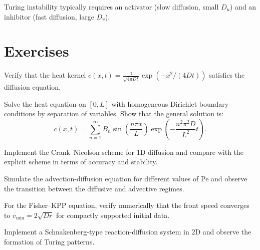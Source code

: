 \begin{remark}
Turing instability typically requires an activator (slow diffusion,
small $D_u$) and an inhibitor (fast diffusion, large $D_v$).
\end{remark}

\section{Exercises}

\begin{exercise}
Verify that the heat kernel
$c(x,t)=\frac{1}{\sqrt{4\pi Dt}}\exp(-x^2/(4Dt))$ satisfies the
diffusion equation.
\end{exercise}

\begin{exercise}
Solve the heat equation on $[0,L]$ with homogeneous Dirichlet
boundary conditions by separation of variables.  Show that the
general solution is:
\[
  c(x,t) = \sum_{n=1}^\infty B_n \sin\!\left(\frac{n\pi x}{L}\right)
  \exp\!\left(-\frac{n^2\pi^2 D}{L^2}t\right).
\]
\end{exercise}

\begin{exercise}
Implement the Crank--Nicolson scheme for 1D diffusion and compare
with the explicit scheme in terms of accuracy and stability.
\end{exercise}

\begin{exercise}
Simulate the advection-diffusion equation for different values of Pe
and observe the transition between the diffusive and advective regimes.
\end{exercise}

\begin{exercise}
For the Fisher--KPP equation, verify numerically that the front speed
converges to $v_{\min}=2\sqrt{Dr}$ for compactly supported initial
data.
\end{exercise}

\begin{exercise}
Implement a Schnakenberg-type reaction-diffusion system in 2D and
observe the formation of Turing patterns.
\end{exercise}
